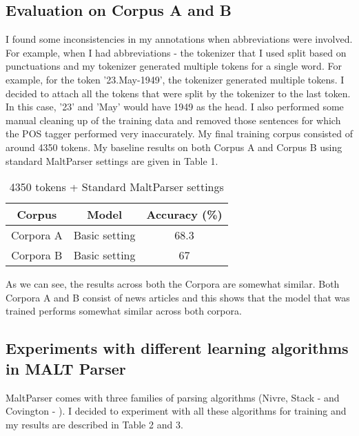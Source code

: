 \documentclass[11pt,letterpaper]{article}
\begin{document}
\subsection{Evaluation on Corpus A and B}

I found some inconsistencies in my annotations when abbreviations were involved. For example, when I had abbreviations - the tokenizer that I used split
based on punctuations and my tokenizer generated multiple tokens for a single word. For example, for the token '23.May-1949', the tokenizer generated multiple tokens.
I decided to attach all the tokens that were split by the tokenizer to the last token. In this case, '23' and 'May' would have 1949 as the head. I also performed some manual cleaning up of
the training data and removed those sentences for which the POS tagger performed very inaccurately. My final training corpus consisted of around 4350 tokens. 
My baseline results on both Corpus A and Corpus B using standard MaltParser settings are given in Table 1.

\begin{table}
\begin{center}
  \begin{tabular}{ c || c || c }
  \hline
  Corpus & Model & Accuracy (\%)\\
  \hline
  Corpora A & Basic setting & 68.3 \\
  Corpora B & Basic setting & 67 \\  
  \hline
   \end{tabular}
\end{center}
\caption{4350 tokens + Standard MaltParser settings}
\label{First}
\end{table}

As we can see, the results across both the Corpora are somewhat similar. Both Corpora A and B consist of news articles and this shows that 
the model that was trained performs somewhat similar across both corpora. 

\subsection{Experiments with different learning algorithms in MALT Parser}

MaltParser comes with three families of parsing algorithms (Nivre, Stack - \cite{nivre2009non}\cite{nivre2009improved} and Covington - \cite{covington2001fundamental}). I decided to experiment with all these algorithms for training and my results are described
in Table 2 and 3.
\end{document}
